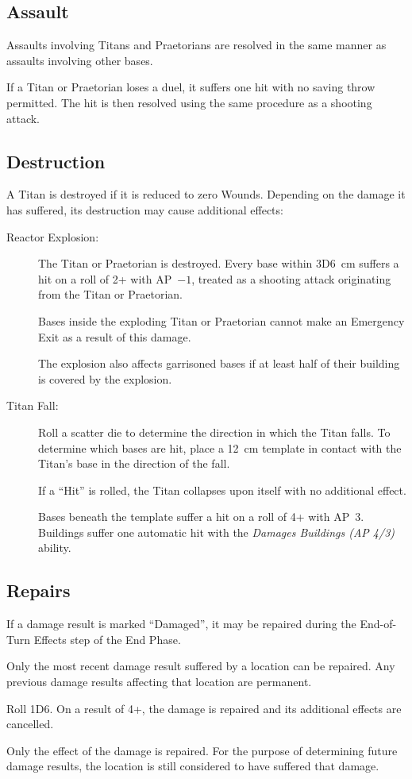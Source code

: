 \subsection{Assault}

Assaults involving Titans and Praetorians are resolved in the same manner as assaults involving other bases.

If a Titan or Praetorian loses a duel, it suffers one hit with no saving throw permitted. The hit is then resolved using the same procedure as a shooting attack.

\subsection{Destruction}

A Titan is destroyed if it is reduced to zero Wounds. Depending on the damage it has suffered, its destruction may cause additional effects:

\begin{description}
    \item[Reactor Explosion:] The Titan or Praetorian is destroyed. Every base within 3D6~cm suffers a hit on a roll of 2+ with AP~$-1$, treated as a shooting attack originating from the Titan or Praetorian.

    Bases inside the exploding Titan or Praetorian cannot make an Emergency Exit as a result of this damage.

    The explosion also affects garrisoned bases if at least half of their building is covered by the explosion.

    \item[Titan Fall:] Roll a scatter die to determine the direction in which the Titan falls. To determine which bases are hit, place a 12~cm template in contact with the Titan's base in the direction of the fall.

    If a ``Hit'' is rolled, the Titan collapses upon itself with no additional effect.

    Bases beneath the template suffer a hit on a roll of 4+ with AP~3. Buildings suffer one automatic hit with the \textit{Damages Buildings (AP 4/3)} ability.
\end{description}

\subsection{Repairs}

If a damage result is marked ``Damaged'', it may be repaired during the End-of-Turn Effects step of the End Phase.

Only the most recent damage result suffered by a location can be repaired. Any previous damage results affecting that location are permanent.

Roll 1D6. On a result of 4+, the damage is repaired and its additional effects are cancelled.

Only the effect of the damage is repaired. For the purpose of determining future damage results, the location is still considered to have suffered that damage.
